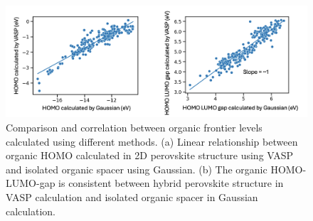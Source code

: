 \begin{figure}[!ht]
\centering
\includegraphics[width=\textwidth]{figures/machine-learning/machine-learning-2.png}
\caption[Comparison and correlation between organic frontier levels calculated using different methods.]{Comparison and correlation between organic frontier levels calculated using different methods. (a) Linear relationship between organic HOMO calculated in 2D perovskite structure using VASP and isolated organic spacer using Gaussian. (b) The organic HOMO-LUMO-gap is consistent between hybrid perovskite structure in VASP calculation and isolated organic spacer in Gaussian calculation.}
\label{f:machinelearning2}
\end{figure}




